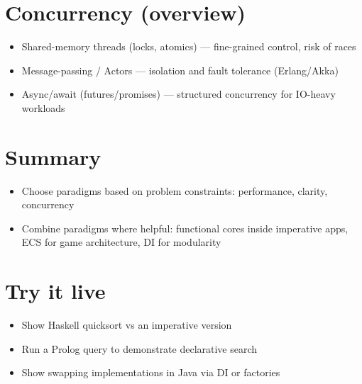 \documentclass{article}
\begin{document}
\pagebreak

\section{Concurrency (overview)}
\begin{itemize}
  \item Shared-memory threads (locks, atomics) — fine-grained control, risk of races
  \item Message-passing / Actors — isolation and fault tolerance (Erlang/Akka)
  \item Async/await (futures/promises) — structured concurrency for IO-heavy workloads
\end{itemize}

\pagebreak

\section{Summary}
\begin{itemize}
  \item Choose paradigms based on problem constraints: performance, clarity, concurrency
  \item Combine paradigms where helpful: functional cores inside imperative apps, ECS for game architecture, DI for modularity
\end{itemize}

\pagebreak

\section*{Try it live}
\begin{itemize}
  \item Show Haskell quicksort vs an imperative version
  \item Run a Prolog query to demonstrate declarative search
  \item Show swapping implementations in Java via DI or factories
\end{itemize}
\end{document}
